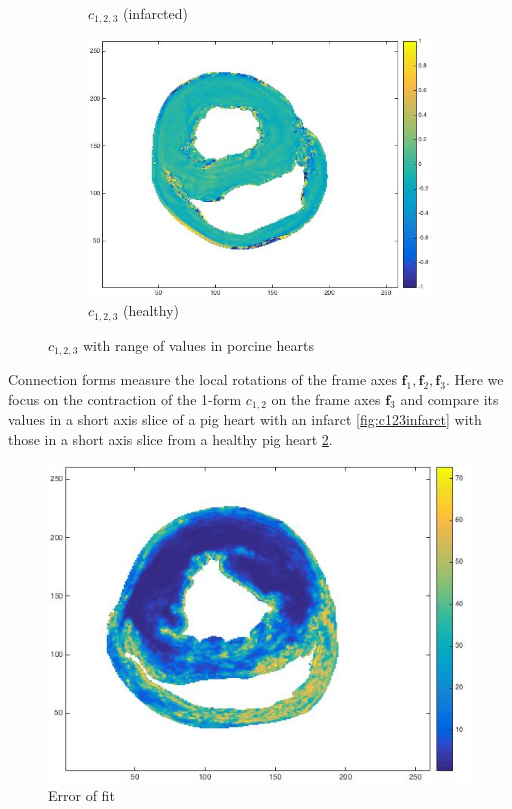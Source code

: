 \begin{figure}[h!]
\begin{subfigure}[h!]{0.3\textwidth}
        \caption{$c_{1,2,3}$ (infarcted)}
        \label{fig:c123infarcted}
    \end{subfigure}
    \hfill
    \begin{subfigure}[h!]{0.3\textwidth}
        \centering
        \includegraphics[width=\textwidth]{figures/pig25_c123_slice_30}
        \caption{$c_{1,2,3}$ (healthy)}
        \label{fig:c123healthy}
    \end{subfigure}
    \caption{$c_{1,2,3}$ with range of values in porcine hearts}
    \label{fig:c123all}
\end{figure}

 Connection forms measure the local rotations of the frame axes $\mathbf{f}_1, \mathbf{f}_2, \mathbf{f}_3$. Here we focus on the contraction of the 1-form $c_{1,2}$ on the frame axes $\mathbf{f}_3$ and compare its values in a short axis slice of a pig heart with an infarct \ref{fig:c123infarct} with those in a short axis slice from a healthy pig heart \ref{fig:c123healthy}. \\
 
 \begin{figure}
     \centering
     \includegraphics[width=\textwidth]{figures/pig4_error_of_fit_slice_19}
     \caption{Error of fit}
     \label{fig:error_of_fit}
 \end{figure}
 
